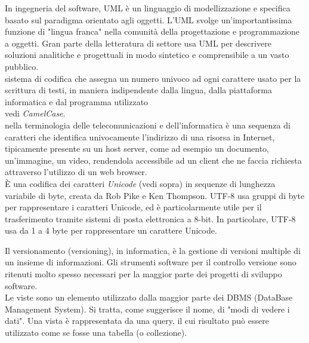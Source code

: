 \documentclass{scalatekids-article}
\begin{document}
   In ingegneria del software, UML è un linguaggio di modellizzazione e specifica basato sul paradigma orientato agli oggetti.
  L'UML svolge un'importantissima funzione di "lingua franca" nella comunità della progettazione e programmazione a oggetti. Gran parte della letteratura di settore usa UML per descrivere soluzioni analitiche e progettuali in modo sintetico e comprensibile a un vasto pubblico.
  \\

    sistema di codifica che assegna un numero univoco ad ogni carattere usato per la scrittura di testi, in maniera indipendente dalla lingua, dalla piattaforma informatica e dal programma utilizzato
   \\

   vedi \textit{CamelCase}.
  \\

   nella terminologia delle telecomunicazioni e dell'informatica è una sequenza di caratteri che identifica univocamente l'indirizzo di una risorsa in Internet, tipicamente presente su un host server, come ad esempio un documento, un'immagine, un video, rendendola accessibile ad un client che ne faccia richiesta attraverso l'utilizzo di un web browser.
  \\

   È una codifica dei caratteri \textit{Unicode} (vedi sopra) in sequenze di lunghezza variabile di byte, creata da Rob Pike e Ken Thompson. UTF-8 usa gruppi di byte per rappresentare i caratteri Unicode, ed è particolarmente utile per il trasferimento tramite sistemi di posta elettronica a 8-bit.
  In particolare, UTF-8 usa da 1 a 4 byte per rappresentare un carattere Unicode.
  \\


   Il versionamento (versioning), in informatica, è la gestione di versioni multiple di un insieme di informazioni.
  Gli strumenti software per il controllo versione sono ritenuti molto spesso necessari per la maggior parte dei progetti di sviluppo software.
  \\
  
   Le viste sono un elemento utilizzato dalla maggior parte dei DBMS (DataBase Management System). Si tratta, come suggerisce il nome, di "modi di vedere i dati".
Una vista è rappresentata da una query, il cui risultato può essere utilizzato come se fosse una tabella (o collezione).
  \\
\end{document}
